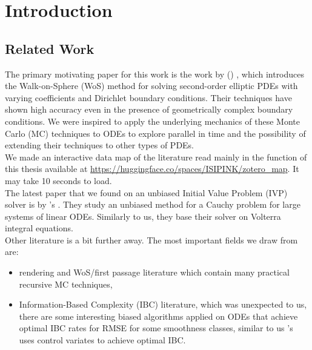 \documentclass[a4paper,12pt]{article}
\begin{document}


\newpage
\tableofcontents
\newpage

\begin{abstract}
  
\end{abstract}


\section{Introduction}

\subsection{Related Work}
The primary motivating paper for this work is the work
by \citeauthor{sawhney_grid-free_2022}
(\citeyear{sawhney_grid-free_2022}) \cite{sawhney_grid-free_2022},
which introduces the Walk-on-Sphere (WoS) method for solving second-order
elliptic PDEs with varying coefficients and Dirichlet boundary conditions.
Their techniques have shown high accuracy even in the presence of geometrically
complex boundary conditions. We were inspired to apply the underlying
mechanics of these Monte Carlo (MC) techniques to ODEs to explore
parallel in time and the possibility of extending their techniques
to other types of PDEs. \\

We made an interactive data map of the literature read
mainly in the function of this thesis available at
\url{https://huggingface.co/spaces/ISIPINK/zotero_map}.
It may take 10 seconds to load. \\

The latest paper that we found on an unbiased Initial Value Problem (IVP) solver is by
\citeauthor{ermakov_monte_2021}'s \citeyear{ermakov_monte_2021}
\cite{ermakov_monte_2021}.  They study an unbiased method for
a Cauchy problem for large systems of linear ODEs.
Similarly to us, they base their solver on Volterra integral equations.\\

Other literature is a bit further away.
The most important fields we draw from are:

\begin{itemize}
  \item rendering and WoS/first passage literature
        which contain many practical recursive
        MC techniques,


  \item  Information-Based Complexity (IBC) literature, which was
        unexpected to us, there are some interesting
        biased algorithms applied on ODEs that achieve optimal
        IBC rates for RMSE for some smoothness classes, similar to us
        \citeauthor{daun_randomized_2011}'s \citeyear{daun_randomized_2011}
        \cite{daun_randomized_2011} uses control variates
        to achieve optimal IBC.
\end{itemize}
\end{document}
